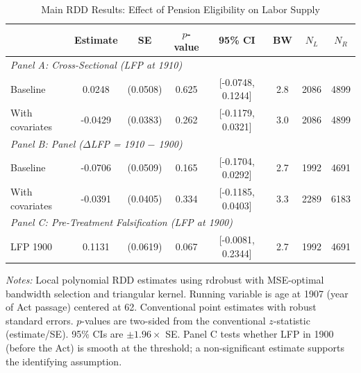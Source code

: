\begin{table}[htbp]
\centering
\caption{Main RDD Results: Effect of Pension Eligibility on Labor Supply}
\label{tab:main_rdd}
\begin{tabular}{lccccccc}
\toprule
  & Estimate & SE & $p$-value & 95\% CI & BW & $N_L$ & $N_R$ \\
\midrule
\multicolumn{8}{l}{\textit{Panel A: Cross-Sectional (LFP at 1910)}} \\
  Baseline & 0.0248 & (0.0508) & 0.625 & [-0.0748, 0.1244] & 2.8 & 2086 & 4899 \\
  With covariates & -0.0429 & (0.0383) & 0.262 & [-0.1179, 0.0321] & 3.0 & 2086 & 4899 \\
\midrule
\multicolumn{8}{l}{\textit{Panel B: Panel ($\Delta$LFP = 1910 $-$ 1900)}} \\
  Baseline & -0.0706 & (0.0509) & 0.165 & [-0.1704, 0.0292] & 2.7 & 1992 & 4691 \\
  With covariates & -0.0391 & (0.0405) & 0.334 & [-0.1185, 0.0403] & 3.3 & 2289 & 6183 \\
\midrule
\multicolumn{8}{l}{\textit{Panel C: Pre-Treatment Falsification (LFP at 1900)}} \\
  LFP 1900 & 0.1131 & (0.0619) & 0.067 & [-0.0081, 0.2344] & 2.7 & 1992 & 4691 \\
\bottomrule
\end{tabular}
\begin{tablenotes}[flushleft]
\small
\item \textit{Notes:} Local polynomial RDD estimates using rdrobust with MSE-optimal bandwidth selection and triangular kernel. Running variable is age at 1907 (year of Act passage) centered at 62. Conventional point estimates with robust standard errors. $p$-values are two-sided from the conventional $z$-statistic (estimate/SE). 95\% CIs are $\pm 1.96 \times$ SE. Panel C tests whether LFP in 1900 (before the Act) is smooth at the threshold; a non-significant estimate supports the identifying assumption.
\end{tablenotes}
\end{table}

